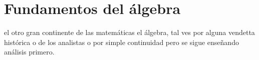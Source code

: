 \chapter{Fundamentos del álgebra} %
\label{cha:fundamentos_del_algebra}

\noindent {} el otro gran continente
de las matemáticas el álgebra, tal ves por alguna vendetta histórica o de los
analistas o por simple continuidad pero se sigue enseñando análisis primero.





